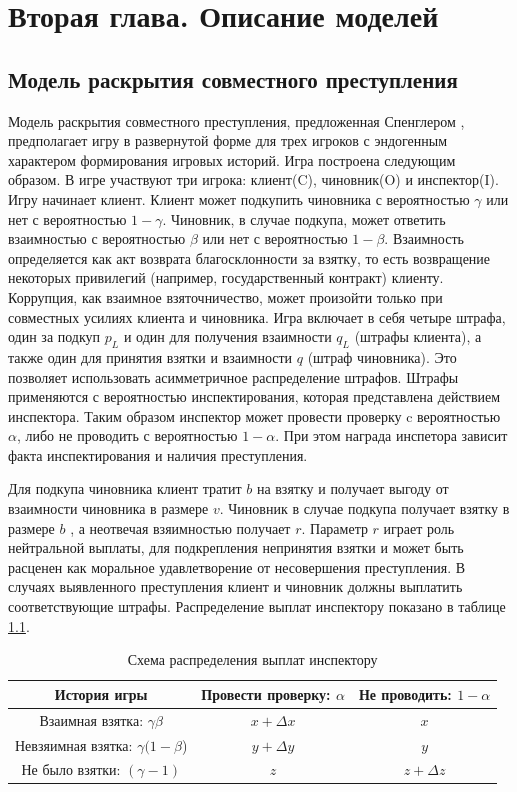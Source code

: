 \chapter{Вторая глава. Описание моделей}
\label{cha:ch_2}
\section{Модель раскрытия совместного преступления}
Модель раскрытия совместного преступления, предложенная Спенглером \cite{Spengler}, предполагает игру в развернутой форме для трех игроков с эндогенным характером формирования игровых историй.
Игра построена следующим образом. В игре участвуют три игрока: клиент(C), чиновник(O) и инспектор(I). Игру начинает клиент. Клиент может подкупить чиновника с вероятностью $\gamma$ или нет с вероятностью $1 - \gamma$. Чиновник, в случае подкупа, может ответить взаимностью с вероятностью $\beta$ или нет с вероятностью $1 - \beta$. Взаимность определяется как акт возврата благосклонности за взятку, то есть возвращение некоторых привилегий (например, государственный контракт) клиенту. Коррупция, как взаимное взяточничество, может произойти только при совместных усилиях клиента и чиновника. Игра включает в себя четыре штрафа, один за подкуп $p_L$ и один для получения взаимности $q_L$ (штрафы клиента), а также один для принятия взятки и взаимности $q$ (штраф чиновника). Это позволяет использовать асимметричное распределение штрафов. Штрафы применяются с вероятностью инспектирования, которая представлена действием инспектора. Таким образом инспектор может провести проверку c вероятностью $\alpha$, либо не проводить с вероятностью $1 - \alpha$. При этом награда инспетора зависит факта инспектирования и наличия преступления. 
\par 
Для подкупа чиновника клиент тратит $b$ на взятку и получает выгоду от взаимности чиновника в размере $v$. Чиновник в случае подкупа получает взятку в размере $b$ , а неотвечая взяимностью получает $r$. Параметр $r$ играет роль нейтральной выплаты, для подкрепления непринятия взятки и может быть расценен как моральное удавлетворение от несовершения преступления. В случаях выявленного преступления клиент и чиновник должны выплатить соответствующие штрафы. 
Распределение выплат инспектору показано в таблице \ref{tbl:inspr1}.
\begin{table}[H]
	\centering
	\begin{tabular}[t]{|c|c|c|}
		\hline
		История игры & Провести проверку: $\alpha$ & Не проводить: $1-\alpha$ \\
		\hline
		Взаимная взятка: $\gamma \beta$ & $x + \Delta x$ & $x$ \\
		\hline
		Невзяимная взятка: $\gamma (1 - \beta$) &  $y + \Delta y$ & $y$ \\
		\hline
		Не было взятки: $(\gamma - 1)$ &  $z$ & $z + \Delta z$ \\
		\hline
	\end{tabular}
	\caption{\centering Схема распределения выплат инспектору}
	\label{tbl:inspr1}
\end{table}
